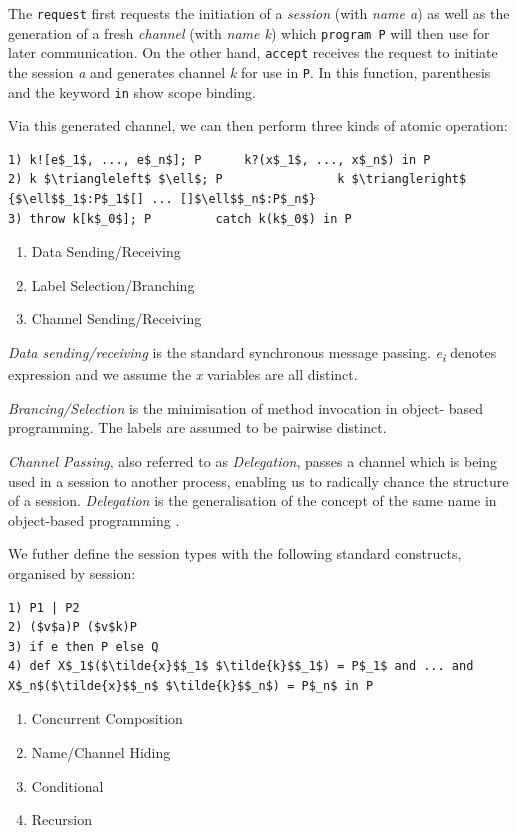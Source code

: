 \documentclass[11pt]{scrartcl}
\begin{document}
The \texttt{request} first requests the initiation of a \emph{session} (with 
\emph{name a}) as well as the generation of a fresh \emph{channel} (with 
\emph{name k}) which \texttt{program P} will then use for later communication. 
On the other hand, \texttt{accept} receives the request to initiate the session 
\emph{a} and generates channel \emph{k} for use in \texttt{P}. In this function, 
parenthesis and the keyword \texttt{in} show scope binding.

Via this generated channel, we can then perform three kinds of atomic operation:

\begin{lstlisting}
1) k![e$_1$, ..., e$_n$]; P      k?(x$_1$, ..., x$_n$) in P
2) k $\triangleleft$ $\ell$; P                k $\triangleright$ {$\ell$$_1$:P$_1$[] ... []$\ell$$_n$:P$_n$}
3) throw k[k$_0$]; P         catch k(k$_0$) in P 
\end{lstlisting}	

\begin{enumerate}
  \item Data Sending/Receiving
  \item Label Selection/Branching
  \item Channel Sending/Receiving
\end{enumerate}

\emph{Data sending/receiving} is the standard synchronous message passing. 
\emph{e\textsubscript{i}} denotes expression and we assume the \emph{x} 
variables are all distinct.

\emph{Brancing/Selection} is the minimisation of method invocation in object-
based programming. The labels are assumed to be pairwise distinct. 

\emph{Channel Passing}, also referred to as \emph{Delegation}, passes a channel 
which is being used in a session to another process, enabling us to radically 
chance the structure of a session. \emph{Delegation} is the generalisation of 
the concept of the same name in object-based programming \cite{YT87}.

We futher define the session types with the following standard constructs, 
organised by session:

\begin{lstlisting}
1) P1 | P2
2) ($v$a)P ($v$k)P 
3) if e then P else Q 
4) def X$_1$($\tilde{x}$$_1$ $\tilde{k}$$_1$) = P$_1$ and ... and X$_n$($\tilde{x}$$_n$ $\tilde{k}$$_n$) = P$_n$ in P
\end{lstlisting}

\begin{enumerate}
  \item Concurrent Composition
  \item Name/Channel Hiding
  \item Conditional
  \item Recursion
\end{enumerate}
\end{document}
